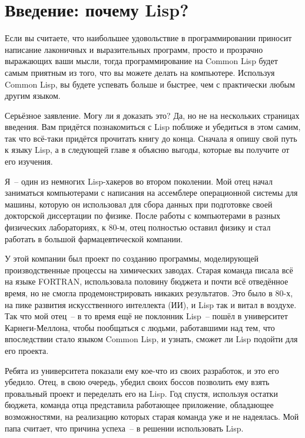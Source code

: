 \chapter{Введение: почему Lisp?}
\label{ch:01}

\thispagestyle{empty}

Если вы считаете, что наибольшее удовольствие в программировании приносит напи\-са\-ние
лаконичных и выразительных программ, просто и прозрачно выражающих ваши мысли, тогда
программирование на Common Lisp будет самым приятным из того, что вы можете делать на
компьютере. Используя Common Lisp, вы будете успевать больше и быстрее, чем с
практически любым другим языком.

Серьёзное заявление. Могу ли я доказать это? Да, но не на нескольких страницах
введения. Вам придётся познакомиться с Lisp поближе и убедиться в этом самим, так что
всё-таки придётся прочитать книгу до конца. Сначала я опишу свой путь к языку Lisp, а в
следующей главе я объясню выгоды, которые вы получите от его изучения.

Я~-- один из немногих Lisp-хакеров во втором поколении. Мой отец начал заниматься
компьютерами с написания на ассемблере операционной системы для машины, которую он
использовал для сбора данных при подготовке своей докторской диссертации по физике. После
работы с компьютерами в разных физических лабораториях, к 80-м, отец полностью оставил
физику и стал работать в большой фармацевтической компании.

У этой компании был проект по созданию программы, моделирующей производственные процессы
на химических заводах. Старая команда писала всё на языке FORTRAN, использовала половину бюджета и
почти всё отведённое время, но не смогла продемонстрировать никаких результатов. Это было в
80-х, на пике развития искусственного интеллекта (ИИ), и Lisp так и витал в воздухе. Так что
мой отец~-- в то время ещё не поклонник Lisp~-- пошёл в университет Карнеги-Меллона,
чтобы пообщаться с людьми, работавшими над тем, что впоследствии стало языком Common Lisp, и
узнать, сможет ли Lisp подойти для его проекта.

Ребята из университета показали ему кое-что из своих разработок, и это его убедило. Отец,
в свою очередь, убедил своих боссов позволить ему взять провальный проект и переделать его на
Lisp. Год спустя, используя остатки бюджета, команда отца представила работающее
приложение, обладающее возможностями, на реализацию которых старая команда уже и не
надеялась. Мой папа считает, что причина успеха~-- в решении использовать Lisp.

